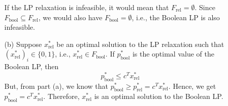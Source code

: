 \documentclass{article}
\begin{document}
\begin{itemize}
\begin{itemize}
    If the LP relaxation is infeasible, it would mean that $F_{\text{rel}} = \emptyset$. Since $F_{\text{bool}} \subseteq F_{\text{rel}}$, we would also have $F_{\text{bool}} = \emptyset$, i.e., the Boolean LP is also infeasible.
    \item[(b)] Suppose $x^*_{\text{rel}}$ be an optimal solution to the LP relaxation such that $(x^*_{\text{rel}})_i \in \{0, 1\}$, i.e., $x^*_{\text{rel}} \in F_{\text{bool}}$. If $p^*_{\text{bool}}$ is the optimal value of the Boolean LP, then
    \[ p^*_{\text{bool}} \le c^T x^*_{\text{rel}} \]
    But, from part (a), we know that $p^*_{\text{bool}} \ge p^*_{\text{rel}} = c^T x^*_{\text{rel}}$. Hence, we get $p^*_{\text{bool}} = c^T x^*_{\text{rel}}$. Therefore, $x^*_{\text{rel}}$ is an optimal solution to the Boolean LP.
  \end{itemize}


\end{itemize}
\end{document}
